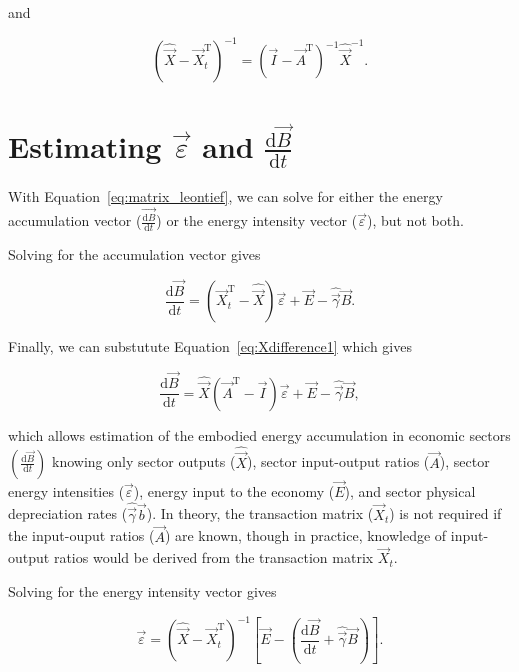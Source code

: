 \noindent and

\begin{equation} \label{eq:Xdifference2_inverse}
	{\left(\hat{\vec{X}} - \vec{X}_{t}^{\mathrm{T}}\right)}^{-1} 
	= {(\vec{I} - \vec{A}^{\mathrm{T}})}^{-1}\hat{\vec{X}}^{-1}.
\end{equation}


\section{Estimating $\vec{\varepsilon}$ and $\frac{\mathrm{d}\vec{B}}{\mathrm{d}t}$}

With Equation~\ref{eq:matrix_leontief}, we can solve for either 
the energy accumulation vector ($\vec{\frac{\mathrm{d}B}{\mathrm{d}t}}$) 
or the energy intensity vector ($\vec{\varepsilon}$), 
but not both. 

Solving for the accumulation vector gives

\begin{equation} \label{eq:dB_dt_leontief}
	\frac{\mathrm{d}\vec{B}}{\mathrm{d}t} = (\vec{X}_{t}^{\mathrm{T}} - \hat{\vec{X}})\vec{\varepsilon} + \vec{E} - \hat{\vec{\gamma}}\vec{B}.
\end{equation}

\noindent Finally, we can substutute Equation~\ref{eq:Xdifference1} which gives

\begin{equation} \label{eq:dB_dt_leontief_with_A}
	\frac{\mathrm{d}\vec{B}}{\mathrm{d}t} = \hat{\vec{X}} (\vec{A}^{\mathrm{T}} - \vec{I}) \vec{\varepsilon} + \vec{E} - \hat{\vec{\gamma}}\vec{B},
\end{equation}

\noindent{}which allows estimation of the embodied energy accumulation 
in economic sectors $\left(\frac{\mathrm{d}\vec{B}}{\mathrm{d}t}\right)$ 
knowing only sector outputs ($\hat{\vec{X}}$), 
sector input-output ratios ($\vec{A}$), 
sector energy intensities ($\vec{\varepsilon}$), 
energy input to the economy ($\vec{E}$), 
and sector physical depreciation rates ($\hat{\vec{\gamma}}\vec{b}$). 
In theory, the transaction matrix ($\vec{X}_{t}$) is not required 
if the input-ouput ratios ($\vec{A}$) are known, 
though in practice, knowledge of input-output ratios 
would be derived from the transaction matrix $\vec{X}_{t}$.

Solving for the energy intensity vector gives

\begin{equation} \label{eq:epsilon_leontief}
	\vec{\varepsilon} 
	= {(\hat{\vec{X}} - \vec{X}_{t}^{\mathrm{T}})}^{-1}
		\left[\vec{E} 
				- \left(\frac{\mathrm{d}\vec{B}}{\mathrm{d}t} 
				+ \hat{\vec{\gamma}}\vec{B}\right)
		\right].
\end{equation}

